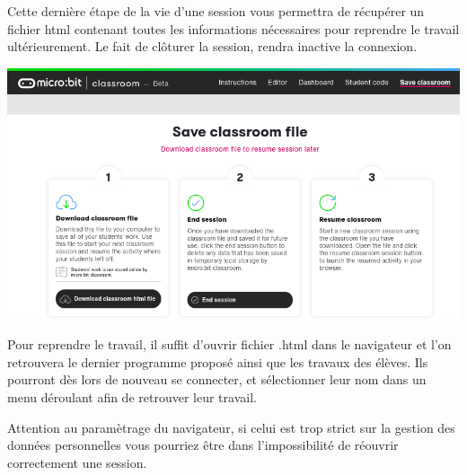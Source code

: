     \begin{methode}
        Cette dernière étape de la vie d'une session vous permettra de récupérer un fichier html
        contenant toutes les informations nécessaires pour reprendre le travail ultérieurement.
        Le fait de clôturer la session, rendra inactive la connexion.
        
    \vspace{5mm}
    
    \centerline{\includegraphics[width=0.7\linewidth]{res/classroom_save.png}}
        
        Pour reprendre le travail, il suffit d'ouvrir fichier .html dans le navigateur et l'on 
        retrouvera le dernier programme proposé ainsi que les travaux des élèves. Ils pourront
         dès lors de nouveau se connecter, et sélectionner leur nom dans un menu déroulant afin de 
         retrouver leur travail.

    \end{methode}

    \begin{remarque}
        Attention au paramètrage du navigateur, si celui est trop strict sur la gestion des
         données personnelles vous pourriez être dans l'impossibilité de réouvrir correctement
         une session.
    \end{remarque}

